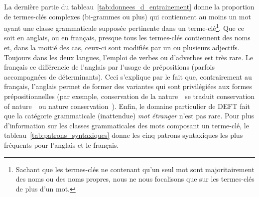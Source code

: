     La dernière partie du tableau~\ref{tab:donnees_d_entrainement} donne la
    proportion de termes-clés complexes (bi-grammes ou plus) qui contiennent au
    moins un mot ayant une classe grammaticale supposée pertinente dans un
    terme-clé\footnote{Sachant que les termes-clés ne contenant qu'un seul mot
    sont majoritairement des noms ou des noms propres, nous ne nous focalisons
    que sur les termes-clés de plus d'un mot.}. Que ce soit en anglais, ou en
    français, presque tous les termes-clés contiennent des noms et, dans la
    moitié des cas, ceux-ci sont modifiés par un ou plusieurs adjectifs.
    Toujours dans les deux langues, l'emploi de verbes ou d'adverbes est très
    rare. Le français ce différencie de l'anglais par l'usage de prépositions
    (parfois accompagnées de déterminants). Ceci s'explique par le fait que,
    contrairement au français, l'anglais permet de former des variantes qui sont
    privilégiées aux formes prépositionnelles (par exemple, \og conservation de
    la nature~\fg\ se traduit \og conservation of nature~\fg\ ou \og nature
    conservation~\fg). Enfin, le domaine particulier de DEFT fait que la
    catégorie grammaticale (inattendue) \textit{mot étranger} n'est pas rare.
    Pour plus d'information sur les classes grammaticales des mots composant un
    terme-clé, le tableau~\ref{tab:patrons_syntaxiques} donne les cinq patrons
    syntaxiques les plus fréquents pour l'anglais et le français.
